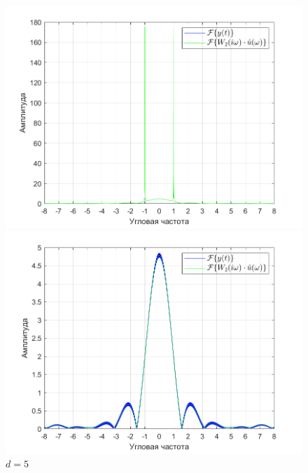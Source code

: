 \documentclass[a4paper]{article}
\begin{document}
\begin{figure}[H]
    \begin{minipage}{0.5\textwidth}
        \centering
        \includegraphics[width=\linewidth]{ex1_2/a1=0_a2=25_b1=10.5_b2=25_d=1/h5.png}
        \caption{$d=1$}
    \end{minipage}
    \begin{minipage}{0.5\textwidth}
        \centering
        \includegraphics[width=\linewidth]{ex1_2/a1=0_a2=25_b1=10.5_b2=25_d=5/h5.png}
        \caption{$d=5$}
    \end{minipage}
\end{figure}
\end{document}
